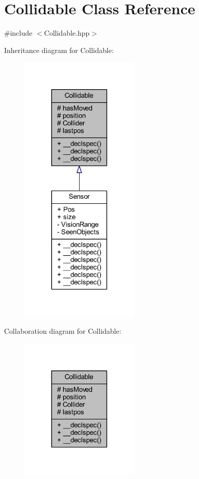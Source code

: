 \hypertarget{class_collidable}{\section{Collidable Class Reference}
\label{class_collidable}
}


{\ttfamily \#include $<$Collidable.\-hpp$>$}



Inheritance diagram for Collidable\-:
\nopagebreak
\begin{figure}[H]
\begin{center}
\leavevmode
\includegraphics[width=161pt]{class_collidable__inherit__graph}
\end{center}
\end{figure}


Collaboration diagram for Collidable\-:
\nopagebreak
\begin{figure}[H]
\begin{center}
\leavevmode
\includegraphics[width=161pt]{class_collidable__coll__graph}
\end{center}
\end{figure}

